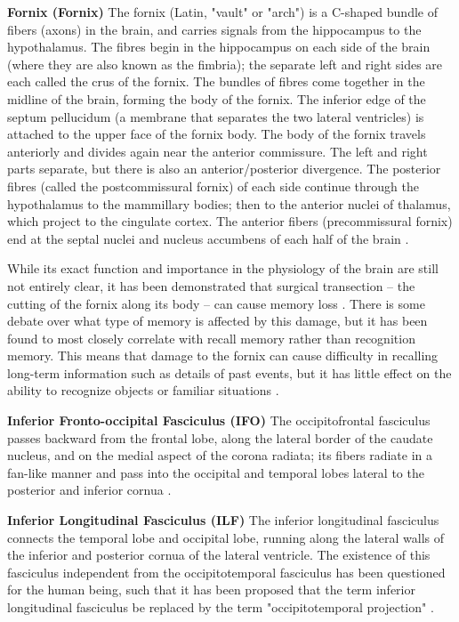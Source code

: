\documentclass[../structure.tex]{subfiles}
\begin{document}
		\textbf{Fornix (Fornix)}
		The fornix (Latin, "vault" or "arch") is a C-shaped bundle of fibers (axons) in the brain, and carries signals from the hippocampus to the hypothalamus.
The fibres begin in the hippocampus on each side of the brain (where they are also known as the fimbria); the separate left and right sides are each called the crus of the fornix. The bundles of fibres come together in the midline of the brain, forming the body of the fornix. The inferior edge of the septum pellucidum (a membrane that separates the two lateral ventricles) is attached to the upper face of the fornix body.
The body of the fornix travels anteriorly and divides again near the anterior commissure. The left and right parts separate, but there is also an anterior/posterior divergence.
The posterior fibres (called the postcommissural fornix) of each side continue through the hypothalamus to the mammillary bodies; then to the anterior nuclei of thalamus, which project to the cingulate cortex.
The anterior fibers (precommissural fornix) end at the septal nuclei and nucleus accumbens of each half of the brain \cite{PDD2015}.

		While its exact function and importance in the physiology of the brain are still not entirely clear, it has been demonstrated that surgical transection – the cutting of the fornix along its body – can cause memory loss \cite{HenryGray1918}. There is some debate over what type of memory is affected by this damage, but it has been found to most closely correlate with recall memory rather than recognition memory. This means that damage to the fornix can cause difficulty in recalling long-term information such as details of past events, but it has little effect on the ability to recognize objects or familiar situations \cite{HenryGray1918}.
		
		\textbf{Inferior Fronto-occipital Fasciculus (IFO)}
		The occipitofrontal fasciculus passes backward from the frontal lobe, along the lateral border of the caudate nucleus, and on the medial aspect of the corona radiata; its fibers radiate in a fan-like manner and pass into the occipital and temporal lobes lateral to the posterior and inferior cornua \cite{PDD2015}.
		
		\textbf{Inferior Longitudinal Fasciculus (ILF)}
		The inferior longitudinal fasciculus connects the temporal lobe and occipital lobe, running along the lateral walls of the inferior and posterior cornua of the lateral ventricle.
The existence of this fasciculus independent from the occipitotemporal fasciculus has been questioned for the human being, such that it has been proposed that the term inferior longitudinal fasciculus be replaced by the term "occipitotemporal projection" \cite{PDD2015}.
\end{document}
